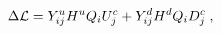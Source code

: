 \begin{equation}
\Delta{\cal L}= 
Y_{ij}^u H^u Q_{i} U_{j}^c + Y_{ij}^d H^d Q_{i} D_{j}^c \;,
\end{equation}

